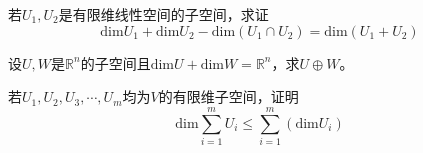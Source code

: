 \begin{reidai}
	若$U_1,U_2$是有限维线性空间的子空间，求证$$\text{dim}U_1+\text{dim}U_2-\text{dim}(U_1 \cap U_2)=\text{dim}(U_1+U_2)$$
\end{reidai}

\begin{reidai}
	设$U,W$是$\mathbb{R}^n$的子空间且$\text{dim}U+\text{dim}W=\mathbb{R}^n$，求$U \oplus W$。
\end{reidai}

\begin{reidai}
	若$U_1,U_2,U_3,\cdots,U_m$均为$V$的有限维子空间，证明$$\text{dim} \sum_{i=1}^{m}U_i\le \sum_{i=1}^{m} \left ( \text{dim} U_i \right ) $$
\end{reidai}

